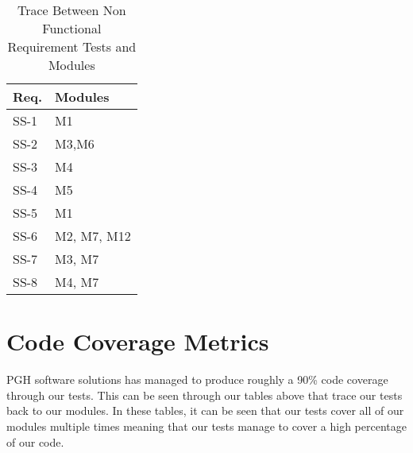\documentclass[12pt, titlepage]{article}
\begin{document}
\begin{table}[H]
\begin{tabular}{p{} p{}}
\toprule
\textbf{Req.} & \textbf{Modules}\\
\midrule
SS-1 & M1\\
SS-2 & M3,M6\\
SS-3 & M4\\
SS-4 & M5\\
SS-5 & M1\\
SS-6 & M2, M7, M12\\
SS-7 & M3, M7\\
SS-8 & M4, M7\\
\bottomrule
\end{tabular}
\caption{Trace Between Non Functional Requirement Tests and Modules}
\end{table}			

\section{Code Coverage Metrics}
PGH software solutions has managed to produce roughly a 90\% code coverage through our tests. This can be seen through our tables above that trace our tests back to our modules. In these tables, it can be seen that our tests cover all of our modules multiple times meaning that our tests manage to cover a high percentage of our code.
\end{document}
